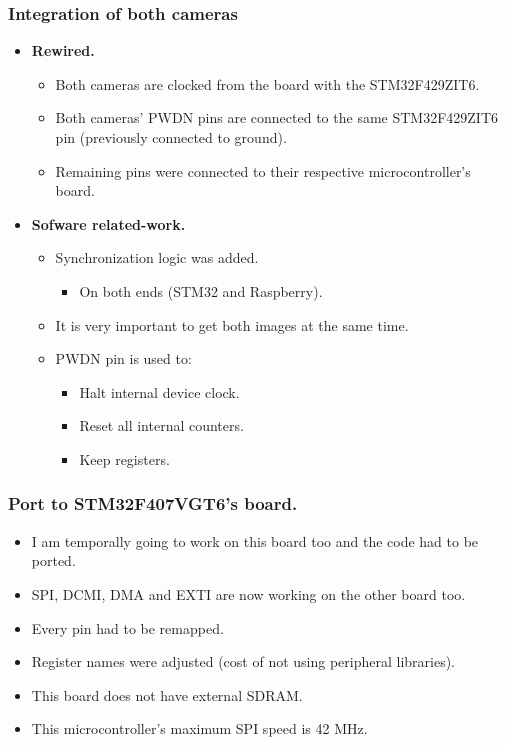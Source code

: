 \subsubsection{Integration of both cameras}
\begin{itemize}
	\item \textbf{Rewired.}
	\begin{itemize}
		\item Both cameras are clocked from the board with the STM32F429ZIT6.
		\item Both cameras' PWDN pins are connected to the same STM32F429ZIT6 pin (previously connected to ground).
		\item Remaining pins were connected to their respective microcontroller's board.
	\end{itemize}
	\item \textbf{Sofware related-work.}
	\begin{itemize}
		\item Synchronization logic was added.
		\begin{itemize}
			\item On both ends (STM32 and Raspberry).
		\end{itemize}
		\item It is very important to get both images at the same time.
		\item PWDN pin is used to:
		\begin{itemize}
			\item Halt internal device clock.
			\item Reset all internal counters.
			\item Keep registers.
		\end{itemize}
	\end{itemize}
\end{itemize}


\subsubsection{Port to STM32F407VGT6's board.}
\begin{itemize}
	\item I am temporally going to work on this board too and the code had to be ported.
	\item SPI, DCMI, DMA and EXTI are now working on the other board too.
	\item Every pin had to be remapped.
	\item Register names were adjusted (cost of not using peripheral libraries).
	\item This board does not have external SDRAM.
	\item This microcontroller's maximum SPI speed is 42 MHz.
\end{itemize}

